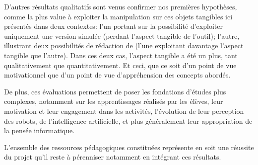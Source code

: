 D'autres résultats qualitatifs sont venus confirmer nos premières hypothèses, comme la plus value à exploiter la manipulation sur ces objets tangibles ici présentés dans deux contextes: l'un portant sur la possibilité d'exploiter uniquement une version simulée (perdant l'aspect tangible de l'outil); l'autre, illustrant deux possibilités de rédaction de  (l'une exploitant davantage l'aspect tangible que l'autre). Dans ces deux cas, l'aspect tangible a été un plus, tant qualitativement que quantitativement. Et ceci, que ce soit d'un point de vue motivationnel que d'un point de vue d'appréhension des concepts abordés.\par%
De plus, ces évaluations permettent de poser les fondations d'études plus complexes, notamment sur les apprentissages réalisés par les élèves, leur motivation et leur engagement dans les activités, l'évolution de leur perception des robots, de l'intelligence artificielle, et plus généralement leur appropriation de la pensée informatique.\par%
L'ensemble des ressources pédagogiques constituées représente en soit une réussite du projet qu'il reste à pérenniser notamment en intégrant ces résultats.
